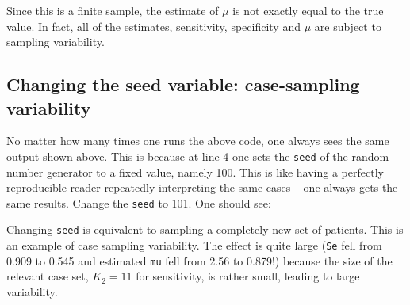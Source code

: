 \documentclass[
]{book}
\newenvironment{Shaded}{\begin{snugshade}}{\end{snugshade}}
\newcommand{\CharTok}[1]{\textcolor[rgb]{0.31,0.60,0.02}{#1}}
\newcommand{\CommentTok}[1]{\textcolor[rgb]{0.56,0.35,0.01}{\textit{#1}}}
\newcommand{\DecValTok}[1]{\textcolor[rgb]{0.00,0.00,0.81}{#1}}
\newcommand{\KeywordTok}[1]{\textcolor[rgb]{0.13,0.29,0.53}{\textbf{#1}}}
\newcommand{\NormalTok}[1]{#1}
\newcommand{\OperatorTok}[1]{\textcolor[rgb]{0.81,0.36,0.00}{\textbf{#1}}}
\newcommand{\StringTok}[1]{\textcolor[rgb]{0.31,0.60,0.02}{#1}}
\begin{document}
Since this is a finite sample, the estimate of \(\mu\) is not exactly equal to the true value. In fact, all of the estimates, sensitivity, specificity and \(\mu\) are subject to sampling variability.

\hypertarget{changing-the-seed-variable-case-sampling-variability}{%
\subsection{Changing the seed variable: case-sampling variability}\label{changing-the-seed-variable-case-sampling-variability}}

No matter how many times one runs the above code, one always sees the same output shown above. This is because at line 4 one sets the \texttt{seed} of the random number generator to a fixed value, namely 100. This is like having a perfectly reproducible reader repeatedly interpreting the same cases -- one always gets the same results. Change the \texttt{seed} to 101. One should see:

\begin{Shaded}
\end{Shaded}

Changing \texttt{seed} is equivalent to sampling a completely new set of patients. This is an example of case sampling variability. The effect is quite large (\texttt{Se} fell from 0.909 to 0.545 and estimated \texttt{mu} fell from 2.56 to 0.879!) because the size of the relevant case set, \(K_2=11\) for sensitivity, is rather small, leading to large variability.
\end{document}
